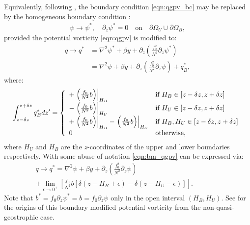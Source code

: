 \documentclass[a4paper]{book}
\begin{document}
Equivalently, following \citet{bretherton1966}, the boundary condition
\eqref{eqn:qgpv_bc} may be replaced by the homogeneous boundary condition :
\begin{align}\label{eqn:bm_qgs}
  \psi \rightarrow \psi^*, \quad \partial_z \psi^* = 0 \quad \textrm{on} \quad \partial \Omega_U \cup \partial \Omega_B,
\end{align}
provided the potential vorticity \eqref{eqn:qgpv} is modified to:
\begin{align}\label{eqn:bm_qgpv}
  q \rightarrow q^* & = \nabla^2 \psi^* + \beta y + \partial_z \left( \frac{f_0^2}{N^2} \partial_z \psi^* \right) \nonumber \\
                    & = \nabla^2 \psi + \beta y + \partial_z \left( \frac{f_0^2}{N^2} \partial_z \psi \right) + q^*_B,
\end{align}
where:
\begin{equation}
  \int_{z - \delta z}^{z + \delta z} q^*_B dz' = \left\{
                                                   \begin{array}{l l}
                                                     + \left. \left( \frac{f_0}{N^2} b \right) \right|_{H_B} & \textrm{if } H_B \in \left[ z - \delta z, z + \delta z \right] \\
                                                     - \left. \left( \frac{f_0}{N^2} b \right) \right|_{H_U} & \textrm{if } H_U \in \left[ z - \delta z, z + \delta z \right] \\
                                                     + \left. \left( \frac{f_0}{N^2} b \right) \right|_{H_B} - \left. \left( \frac{f_0}{N^2} b \right) \right|_{H_U} & \textrm{if } H_B, H_U \in \left[ z - \delta z, z + \delta z \right] \\
                                                     0                                                  & \textrm{otherwise},
                                                   \end{array}
                                                \right.
\end{equation}
where $H_U$ and $H_B$ are the $z$-coordinates of the upper and lower boundaries
respectively. With some abuse of notation \eqref{eqn:bm_qgpv} can be expressed
via:
\begin{align}
  q \rightarrow q^* = \nabla^2 \psi + \beta y + \partial_z \left( \frac{f_0^2}{N^2} \partial_z \psi \right) \qquad \qquad \qquad \qquad \qquad \qquad \nonumber \\
    + \lim_{\epsilon \rightarrow 0^+} \left[ \frac{f_0}{N^2} b \left[ \delta (z - H_B + \epsilon) - \delta (z - H_U - \epsilon) \right] \right].
\end{align}
Note that $b^* = f_0 \partial_z \psi^* = b = f_0 \partial_z \psi$ only in the
open interval $\left( H_B, H_U \right)$. See \citet{schneider2003} for the
origins of this boundary modified potential vorticity from the
non-quasi-geostrophic case.
\end{document}
